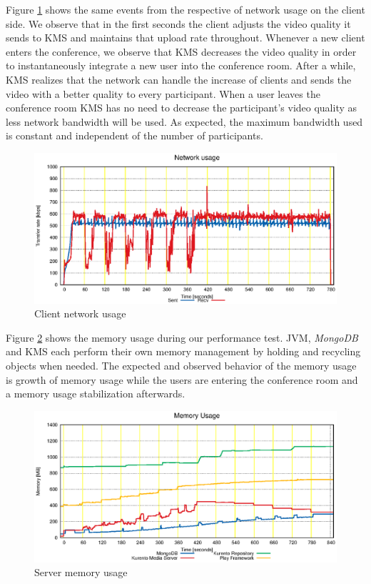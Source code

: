 \documentclass[10pt,conference]{IEEEtran}
\begin{document}
Figure \ref{fig:test_client_net} shows the same events from the respective of network usage on the client side.
We observe that in the first seconds the client adjusts the video quality it sends to \gls{KMS} and maintains that upload rate throughout.
Whenever a new client enters the conference, we observe that \gls{KMS} decreases the video quality in order to instantaneously integrate a new user into the conference room.
After a while, \gls{KMS} realizes that the network can handle the increase of clients and sends the video with a better quality to every participant.
When a user leaves the conference room \gls{KMS} has no need to decrease the participant's video quality as less network bandwidth will be used.
As expected, the maximum bandwidth used is constant and independent of the number of participants.

\begin{figure}
  \centering
  \includegraphics[width=\linewidth]{stats/test_client_net.eps}
  \caption{Client network usage}
  \label{fig:test_client_net}
\end{figure}

Figure \ref{fig:test_ram_fixed_mem} shows the memory usage during our performance test.
\gls{JVM}, \emph{MongoDB} and \gls{KMS} each perform their own memory management by holding and recycling objects when needed.
The expected and observed behavior of the memory usage is growth of memory usage while the users are entering the conference room and a memory usage stabilization afterwards.


\begin{figure}
  \centering
  \includegraphics[width=\linewidth]{stats/test_ram_fixed_mem.eps}
  \caption{Server memory usage}
  \label{fig:test_ram_fixed_mem}
\end{figure}
\end{document}
